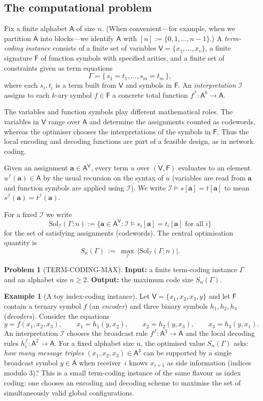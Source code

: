 \documentclass[11pt]{article}
\theoremstyle{definition}
\newtheorem{problem}{Problem}[section]
\newtheorem{example}{Example}[section]
\theoremstyle{plain}
\newcommand{\A}{\mathsf{A}}
\newcommand{\Vars}{\mathsf{V}}
\newcommand{\Fun}{\mathsf{F}}
\newcommand{\Sol}{\mathrm{Sol}}
\newcommand{\Sn}{S_n}
\begin{document}
\subsection{The computational problem}
Fix a finite alphabet $\A$ of size $n$.
(When convenient---for example, when we partition $\A$ into blocks---we identify $\A$ with
$[n]:=\{0,1,\dots,n-1\}$.)
A \emph{term-coding instance} consists of a finite set of variables
$\Vars=\{x_1,\dots,x_v\}$, a finite signature $\Fun$ of function symbols with specified arities,
and a finite set of constraints given as term equations
\[
\Gamma=\{\, s_1=t_1,\dots,s_m=t_m\,\},
\]
where each $s_i,t_i$ is a term built from $\Vars$ and symbols in $\Fun$.
An \emph{interpretation} $\mathcal I$ assigns to each $k$-ary symbol $f\in\Fun$ a concrete total function
$f^\mathcal I:\A^k\to \A$.

The variables and function symbols play different mathematical roles.  The variables in $\Vars$ range over
$\A$ and determine the assignments counted as codewords, whereas the optimiser chooses the interpretations of
the symbols in $\Fun$.  Thus the local encoding and decoding functions are part of a feasible design, as in
network coding.

Given an assignment $\mathbf a\in\A^{\Vars}$, every term $u$ over $(\Vars,\Fun)$ evaluates to an element
$u^{\mathcal I}(\mathbf a)\in\A$ by the usual recursion on the syntax of $u$ (variables are read from $\mathbf a$
and function symbols are applied using $\mathcal I$). We write $\mathcal I \models s[\mathbf a]=t[\mathbf a]$
to mean $s^{\mathcal I}(\mathbf a)=t^{\mathcal I}(\mathbf a)$.

For a fixed $\mathcal I$ we write
\[
\Sol_\mathcal I(\Gamma;n)
:=\bigl\{\mathbf a\in \A^{\Vars} : \mathcal I \models s_i[\mathbf a]=t_i[\mathbf a]\text{ for all }i\bigr\}
\]
for the set of satisfying assignments (codewords).
The central optimisation quantity is
\[
\Sn(\Gamma)\ :=\ \max_{\mathcal I}\ |\Sol_\mathcal I(\Gamma;n)|.
\]
\begin{problem}[TERM-CODING-MAX]
\label{prob:termcoding-max}
\textbf{Input:} a finite term-coding instance $\Gamma$ and an alphabet size $n\ge 2$.
\textbf{Output:} the maximum code size $S_n(\Gamma)$.
\end{problem}
\begin{example}[A toy index-coding instance]
\label{ex:indexcoding}
Let $\Vars=\{x_1,x_2,x_3,y\}$ and let $\Fun$ contain a ternary symbol $f$ (an \emph{encoder}) and three binary
symbols $h_1,h_2,h_3$ (\emph{decoders}).  Consider the equations
\[
  y=f(x_1,x_2,x_3),\qquad
  x_1=h_1(y,x_2),\qquad
  x_2=h_2(y,x_3),\qquad
  x_3=h_3(y,x_1).
\]
An interpretation $\mathcal I$ chooses the broadcast rule $f^{\mathcal I}:\A^3\to\A$ and the local decoding
rules $h_i^{\mathcal I}:\A^2\to\A$.
For a fixed alphabet size $n$, the optimised value $S_n(\Gamma)$ asks: \emph{how many message triples}
$(x_1,x_2,x_3)\in\A^3$ can be supported by a single broadcast symbol $y\in\A$ when receiver~$i$ knows
$x_{i+1}$ as side information (indices modulo $3$)?
This is a small term-coding instance of the same flavour as index coding: one chooses an
encoding and decoding scheme to maximise the set of simultaneously valid global configurations.
\end{example}
\end{document}
